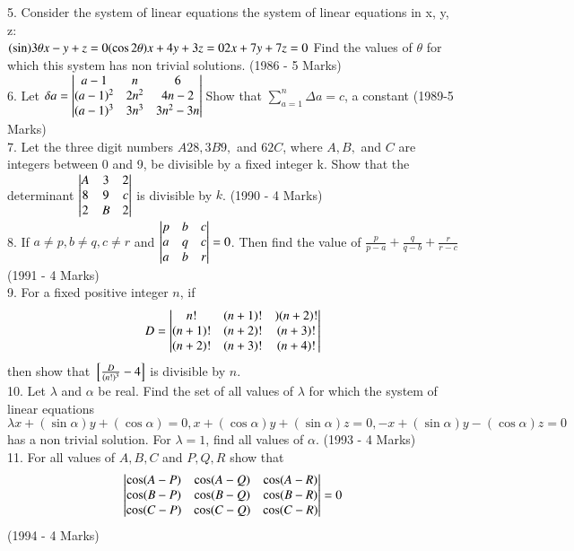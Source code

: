 \documentclass[journal,12pt,twocolumn]{IEEEtran}
\theoremstyle{remark}
\begin{document}
5. Consider the system of linear equations the system of linear equations in x, y, z:\\$(\sin) 3\theta x-y+z=0\\(\cos 2\theta)x+4y+3z=0\\2x+7y+7z=0\\$ Find the values of $\theta$ for which this system has non trivial solutions. \hfill (1986 - 5 Marks)\\[2pt]

6. Let $\delta a=\begin{vmatrix}a-1&n&6\\(a-1)^2&2n^2&4n-2\\(a-1)^3&3n^3&3n^2-3n\end{vmatrix}\\$Show that $\displaystyle\sum_{a=1}^{n}\Delta a=c$, a constant \hfill (1989-5 Marks)\\[2pt]

7. Let the three digit numbers $A28, 3B9,$ and $62C$, where $A, B,$ and $C$ are integers between 0 and 9, be divisible by a fixed integer k. Show that the determinant $\begin{vmatrix}A&3&2\\8&9&c\\2&B&2\end{vmatrix}$ is divisible by $k$. \hfill (1990 - 4 Marks)\\[2pt]

8. If $a\neq p, b\neq q, c\neq r$ and $\begin{vmatrix}p&b&c\\a&q&c\\a&b&r\end{vmatrix}=0$. Then find the value of $\frac{p}{p-a}+\frac{q}{q-b}+\frac{r}{r-c}$ \hfill (1991 - 4 Marks)\\[2pt]

9. For a fixed positive integer $n$, if $$D=\begin{vmatrix}n!&(n+1)!&)(n+2)!\\(n+1)!&(n+2)!&(n+3)!\\(n+2)!&(n+3)!&(n+4)!\end{vmatrix}$$ then show that ${}\left[\frac{D}{(n!)^3}-4\right]$ is divisible by $n$.\\[2pt]

10. Let $\lambda$ and $\alpha$ be real. Find the set of all values of $\lambda$ for which the system of linear equations $$\lambda x+(\sin\alpha)y+(\cos\alpha)=0, x+(\cos\alpha)y+(\sin\alpha)z=0,-x+(\sin\alpha)y-(\cos\alpha)z=0$$ has a non trivial solution. For $\lambda = 1$, find all values of $\alpha$. \hfill (1993 - 4 Marks)\\[2pt]

11. For all values of $A,B,C$ and $P,Q,R$ show that $$\begin{vmatrix}\cos(A-P)&\cos(A-Q)&\cos(A-R)\\\cos(B-P)&\cos(B-Q)&\cos(B-R)\\\cos(C-P)&\cos(C-Q)&\cos(C-R)\end{vmatrix}=0$$ \hfill (1994 - 4 Marks)\\[2pt]
\end{document}
